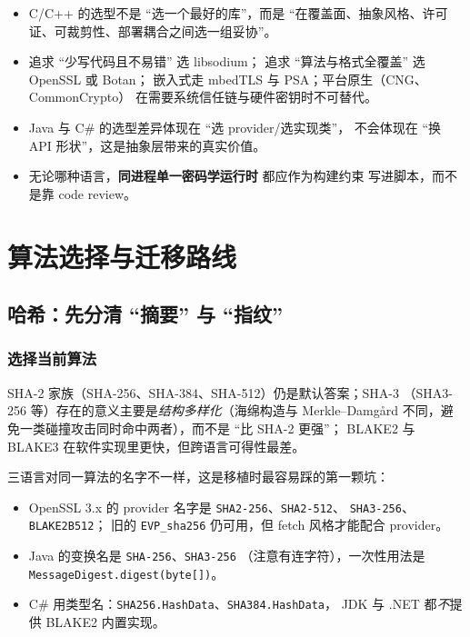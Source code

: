 \documentclass[12pt,a4paper,fontset=fandol]{ctexbook}
\newcommand{\Tp}[1]{\texttt{#1}}
\newcommand{\CSharp}{C\#}
\newcommand{\CppJava}{C/C++}
\begin{document}
\begin{guideline}[title=本章要点]
\begin{itemize}
  \item \CppJava{} 的选型不是 ``选一个最好的库''，而是
        ``在覆盖面、抽象风格、许可证、可裁剪性、部署耦合之间选一组妥协''。
  \item 追求 ``少写代码且不易错'' 选 libsodium；
        追求 ``算法与格式全覆盖'' 选 OpenSSL 或 Botan；
        嵌入式走 mbedTLS 与 PSA；平台原生（CNG、CommonCrypto）
        在需要系统信任链与硬件密钥时不可替代。
  \item Java 与 \CSharp{} 的选型差异体现在 ``选 provider/选实现类''，
        不会体现在 ``换 API 形状''，这是抽象层带来的真实价值。
  \item 无论哪种语言，\textbf{同进程单一密码学运行时} 都应作为构建约束
        写进脚本，而不是靠 code review。
\end{itemize}
\end{guideline}

\chapter{算法选择与迁移路线}

\section{哈希：先分清 ``摘要'' 与 ``指纹''}

\subsection{选择当前算法}

SHA-2 家族（SHA-256、SHA-384、SHA-512）仍是默认答案；SHA-3
（SHA3-256 等）存在的意义主要是\emph{结构多样化}（海绵构造与 Merkle--Damgård
不同，避免一类碰撞攻击同时命中两者），而不是 ``比 SHA-2 更强''；
BLAKE2 与 BLAKE3 在软件实现里更快，但跨语言可得性最差。

三语言对同一算法的名字不一样，这是移植时最容易踩的第一颗坑：

\begin{itemize}
  \item OpenSSL 3.x 的 provider 名字是 \texttt{SHA2-256}、\texttt{SHA2-512}、
        \texttt{SHA3-256}、\texttt{BLAKE2B512}；
        旧的 \Tp{EVP\_sha256} 仍可用，但 fetch 风格才能配合 provider。
  \item Java 的变换名是 \texttt{SHA-256}、\texttt{SHA3-256}
        （注意有连字符），一次性用法是
        \Tp{MessageDigest\allowbreak.digest(byte[])}。
  \item \CSharp{} 用类型名：\Tp{SHA256.HashData}、\Tp{SHA384.HashData}，
        JDK 与 .NET 都\emph{不}提供 BLAKE2 内置实现。
\end{itemize}
\end{document}
